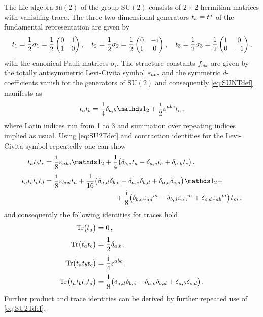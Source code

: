 The Lie algebra $\mathfrak{su}(2)$ of the group $\mathrm{SU}(2)$ consists of $2\times2$ hermitian matrices with vanishing trace.
The three two-dimensional generators $t_{a}\equiv t^{a}$ of the fundamental representation are given by
\begin{align}
	\suIIt{1}=\frac{1}{2}\sigma_1=\frac{1}{2}\begin{pmatrix}0& 1\\1 &0\end{pmatrix},\quad%
	\suIIt{2}=\frac{1}{2}\sigma_2=\frac{1}{2}\begin{pmatrix}0& -\iu\\\iu &0\end{pmatrix},\quad%
	\suIIt{3}=\frac{1}{2}\sigma_3=\frac{1}{2}\begin{pmatrix}1& 0\\0 &-1\end{pmatrix},\label{eq:SU2Tfundamental}
\end{align}
with the canonical Pauli matrices $\sigma_i$.
The structure constants $f_{a b c}$ are given by the totally antisymmetric Levi-Civita symbol $\varepsilon_{a b c}$ and the symmetric $d$-coefficients vanish for the generators of $\mathrm{SU}(2)$ and consequently \cref{eq:SUNTdef} manifests as
\begin{align}
	\suIIt{a}\suIIt{b}=\frac{1}{4}\delta_{a,b}\vts\Id_2+\frac{\iu}{2}\lcs^{a b c}\vts\suIIt{c}\label{eq:SU2Tdef} \, ,
\end{align}
where Latin indices run from 1 to 3 and summation over repeating indices implied as usual.
Using \cref{eq:SU2Tdef} and contraction identities for the Levi-Civita symbol repeatedly one can show
\begin{align}
	\suIIt{a}\suIIt{b}\suIIt{c} &= \frac{\iu}{8}\lcs_{a b c}\vts\Id_2+\frac{1}{4}\big( \delta_{b, c}\vts \suIIt{a} - \delta_{a, c} \vts\suIIt{b} + \delta_{a,b}\vts \suIIt{c}\big) \, ,\\[.25em]
	\suIIt{a}\suIIt{b}\suIIt{c}\suIIt{d} &= \frac{\iu}{8}\lcs_{b c d}\vts\suIIt{a}+\frac{1}{16}\big( \delta_{a,d}\vts\delta_{b, c} - \delta_{a,c}\vts\delta_{b, d} + \delta_{a,b}\vts\delta_{c, d} \big)\vts\Id_2 +\notag\\
	&\qquad\qquad\qquad\qquad\qquad+\frac{\iu}{8}\big(\delta_{b, c}\vts\lcs_{ad}{}^{m} - \delta_{b, d}\vts\lcs_{ac}{}^{m} + \delta_{c, d}\vts\lcs_{ab}{}^{m}\big)\vts\suIIt{m} \, ,
\end{align}
and consequently the following identities for traces hold
\begin{align}
	\operatorname{Tr}\!\big( t_{a} \big) & = 0 \, ,\\[.25em]
	\operatorname{Tr}\!\big( t_{a}t_{b} \big) & = \frac{1}{2}\delta_{a,b} \, ,\\[.25em]
	\operatorname{Tr}\!\big( t_{a}t_{b}t_{c} \big) & = \frac{\mathrm{i}\mkern1mu}{4}\varepsilon^{a b c} \, ,\\[.25em]
	\operatorname{Tr}\!\big( t_{a}t_{b}t_{c}t_{d} \big) & = \frac{1}{8} \big( \delta_{a, d}\mskip1.0mu\delta_{b, c} - \delta_{a,c}\mskip1.0mu\delta_{b, d} + \delta_{a,b}\mskip1.0mu\delta_{c, d} \big) \, .
\end{align}
Further product and trace identities can be derived by further repeated use of \cref{eq:SU2Tdef}.\bigskip

